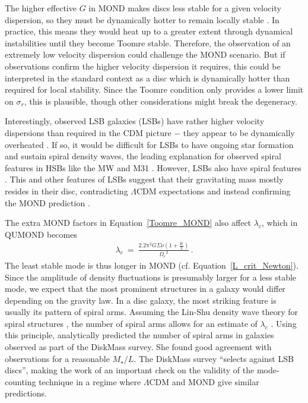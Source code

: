 \documentclass[fleqn,usenatbib,useAMS,onecolumn]{mnras} %
\begin{document}
The higher effective $G$ in MOND makes discs less stable for a given velocity dispersion, so they must be dynamically hotter to remain locally stable \citep{McGaugh_1998}. In practice, this means they would heat up to a greater extent through dynamical instabilities until they become Toomre stable. Therefore, the observation of an extremely low velocity dispersion could challenge the MOND scenario. But if observations confirm the higher velocity dispersion it requires, this could be interpreted in the standard context as a disc which is dynamically hotter than required for local stability. Since the Toomre condition only provides a lower limit on $\sigma_r$, this is plausible, though other considerations might break the degeneracy.

Interestingly, observed LSB galaxies (LSBs) have rather higher velocity dispersions than required in the CDM picture $-$ they appear to be dynamically overheated \citep{Saburova_2011}. If so, it would be difficult for LSBs to have ongoing star formation and sustain spiral density waves, the leading explanation for observed spiral features in HSBs like the MW and M31 \citep{Lin_1964}. However, LSBs also have spiral features \citep{Schombert_1992, Blok_1995, McGaugh_1995_image, Impey_1996}. This and other features of LSBs suggest that their gravitating mass mostly resides in their disc, contradicting $\Lambda$CDM expectations and instead confirming the MOND prediction \citep[section~3.3 of][]{McGaugh_1998}.

The extra MOND factors in Equation~\ref{Toomre_MOND} also affect $\lambda_c$, which in QUMOND becomes
\begin{eqnarray}
	\lambda_c ~=~ \frac{2.2 \mathrm{\pi}^2 G \Sigma \nu \left( 1 + \frac{K}{2} \right)}{{\Omega_r}^2} \, .
	\label{L_crit_MOND}
\end{eqnarray}
The least stable mode is thus longer in MOND (cf. Equation~\ref{L_crit_Newton}). Since the amplitude of density fluctuations is presumably larger for a less stable mode, we expect that the most prominent structures in a galaxy would differ depending on the gravity law. In a disc galaxy, the most striking feature is usually its pattern of spiral arms. Assuming the Lin-Shu density wave theory for spiral structures \citep{Lin_1964}, the number of spiral arms allows for an estimate of $\lambda_c$ \citep{Sellwood_1984, Athanassoula_1987}. Using this principle, \citet{Elena_2015} analytically predicted the number of spiral arms in galaxies observed as part of the DiskMass survey. She found good agreement with observations for a reasonable $M_{\star}/L$. The DiskMass survey ``selects against LSB discs'', making the work of \citet{Elena_2015} an important check on the validity of the mode-counting technique in a regime where $\Lambda$CDM and MOND give similar predictions.
\end{document}
